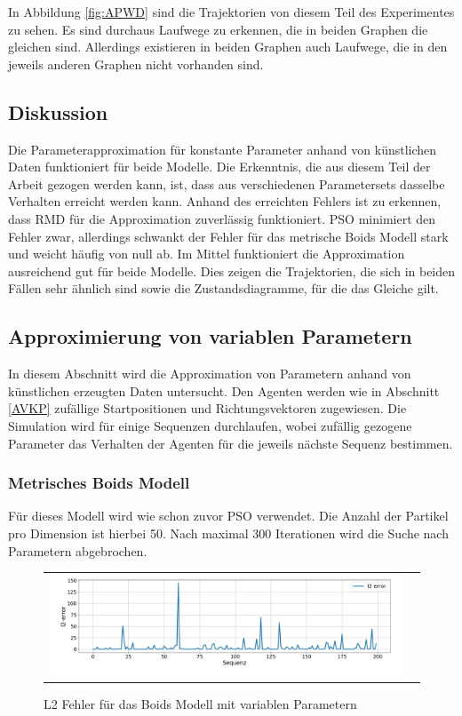 In Abbildung \ref{fig:APWD} sind die Trajektorien von diesem Teil des Experimentes zu sehen. Es sind durchaus Laufwege zu erkennen, die in beiden Graphen die gleichen sind. Allerdings existieren in beiden Graphen auch Laufwege, die in den jeweils anderen Graphen nicht vorhanden sind.

\subsection{Diskussion}

Die Parameterapproximation für konstante Parameter anhand von künstlichen Daten funktioniert für beide Modelle.
Die Erkenntnis, die aus diesem Teil der Arbeit gezogen werden kann, ist, dass aus verschiedenen Parametersets dasselbe Verhalten erreicht werden kann. Anhand des erreichten Fehlers ist zu erkennen, dass RMD für die Approximation zuverlässig funktioniert.
PSO minimiert den Fehler zwar, allerdings schwankt der Fehler für das metrische Boids Modell stark und weicht häufig von null ab.
Im Mittel funktioniert die Approximation ausreichend gut für beide Modelle. Dies zeigen die Trajektorien, die sich in beiden Fällen sehr ähnlich sind sowie die Zustandsdiagramme, für die das Gleiche gilt.


\subsection{Approximierung von variablen Parametern}

In diesem Abschnitt wird die Approximation von Parametern anhand von künstlichen erzeugten Daten untersucht.
Den Agenten werden wie in Abschnitt \ref{AVKP} zufällige Startpositionen und Richtungsvektoren zugewiesen. Die Simulation wird für einige Sequenzen durchlaufen, wobei zufällig gezogene Parameter das Verhalten der Agenten für die jeweils nächste Sequenz bestimmen.


\subsubsection{Metrisches Boids Modell}

Für dieses Modell wird wie schon zuvor PSO verwendet. Die Anzahl der Partikel pro Dimension ist hierbei 50.
Nach maximal 300 Iterationen wird die Suche nach Parametern abgebrochen.

\begin{figure}[H]
\centering
\begin{tabular}{cc}
\includegraphics[width=1.0\textwidth]{figures/Experimente/Parameter_variabel/Boids_l2.png} 
\end{tabular}
\caption{L2 Fehler für das Boids Modell mit variablen Parametern \label{fig:Boids_PV_l2}}
\end{figure}

